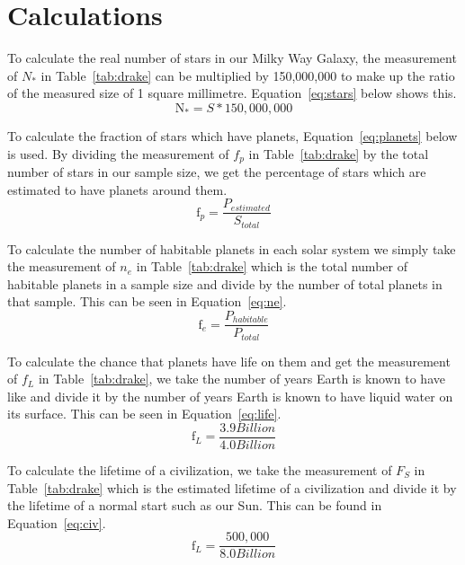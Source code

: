 \documentclass{article}
\begin{document}

\section{Calculations}
\label{sec:calc}

To calculate the real number of stars in our Milky Way Galaxy, the measurement of ${N}_{*}$ in Table~\ref{tab:drake} can be
multiplied by 150,000,000 to make up the ratio of the measured size of 1 square millimetre. Equation~\ref{eq:stars} below 
shows this.
\begin{equation}
\label{eq:stars}
\text{N}_{*} = S * 150,000,000
\end{equation}

To calculate the fraction of stars which have planets, Equation~\ref{eq:planets} below is used. By dividing the measurement of
${f}_{p}$ in Table~\ref{tab:drake} by the total number of stars in our sample size, we get the percentage of stars which are 
estimated to have planets around them.
\begin{equation}
\label{eq:planets}
\text{f}_{p} = \frac{{P}_{estimated}}{{S}_{total}}
\end{equation}

To calculate the number of habitable planets in each solar system we simply take the measurement of 
${n}_{e}$ in Table~\ref{tab:drake} which is the total number of habitable planets in a sample size and divide by the number 
of total planets in that sample. This can be seen in Equation~\ref{eq:ne}.
\begin{equation}
\label{eq:ne}
\text{f}_{e} = \frac{{P}_{habitable}}{{P}_{total}}
\end{equation}

To calculate the chance that planets have life on them and get the measurement of ${f}_{L}$ in Table~\ref{tab:drake}, 
we take the number of years Earth is known to have like and divide it by the number of years Earth is known to have liquid
water on its surface. This can be seen in Equation~\ref{eq:life}.
\begin{equation}
\label{eq:life}
\text{f}_{L} = \frac{3.9 Billion}{4.0 Billion}
\end{equation}

To calculate the lifetime of a civilization, we take the measurement of ${F}_{S}$ in Table~\ref{tab:drake} which is the estimated
lifetime of a civilization and divide it by the lifetime of a normal start such as our Sun. This can be found in Equation~\ref{eq:civ}.
\begin{equation}
\label{eq:civ}
\text{f}_{L} = \frac{500,000}{8.0 Billion}
\end{equation}
\end{document}
